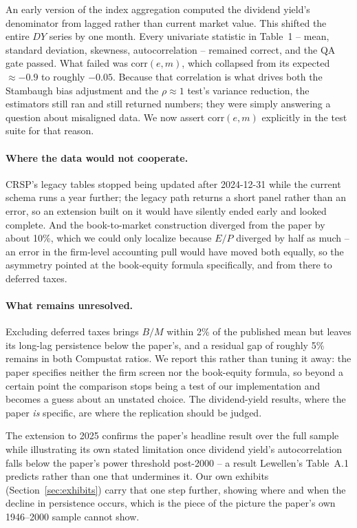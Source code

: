 \documentclass[11pt]{article}
\begin{document}
An early version of the index aggregation computed the dividend yield's
denominator from lagged rather than current market value. This shifted the
entire \(DY\) series by one month. Every univariate statistic in Table~1 --
mean, standard deviation, skewness, autocorrelation -- remained correct, and
the QA gate passed. What failed was \(\mathrm{corr}(e,m)\), which collapsed
from its expected \(\approx -0.9\) to roughly \(-0.05\). Because that
correlation is what drives both the Stambaugh bias adjustment and the
\(\rho \approx 1\) test's variance reduction, the estimators still ran and
still returned numbers; they were simply answering a question about
misaligned data. We now assert \(\mathrm{corr}(e,m)\) explicitly in the test
suite for that reason.

\paragraph{Where the data would not cooperate.}
CRSP's legacy tables stopped being updated after 2024-12-31 while the current
schema runs a year further; the legacy path returns a short panel rather than
an error, so an extension built on it would have silently ended early and
looked complete. And the book-to-market construction diverged from the paper
by about 10\%, which we could only localize because \(E/P\) diverged by half
as much -- an error in the firm-level accounting pull would have moved both
equally, so the asymmetry pointed at the book-equity formula specifically,
and from there to deferred taxes.

\paragraph{What remains unresolved.} Excluding deferred taxes brings \(B/M\)
within 2\% of the published mean but leaves its long-lag persistence below
the paper's, and a residual gap of roughly 5\% remains in both Compustat
ratios. We report this rather than tuning it away: the paper specifies
neither the firm screen nor the book-equity formula, so beyond a certain
point the comparison stops being a test of our implementation and becomes a
guess about an unstated choice. The dividend-yield results, where the paper
\emph{is} specific, are where the replication should be judged.

The extension to 2025 confirms the paper's headline result over the full
sample while illustrating its own stated limitation once dividend yield's
autocorrelation falls below the paper's power threshold post-2000 -- a
result Lewellen's Table~A.1 predicts rather than one that undermines it.
Our own exhibits (Section~\ref{sec:exhibits}) carry that one step further,
showing where and when the decline in persistence occurs, which is the
piece of the picture the paper's own 1946--2000 sample cannot show.
\end{document}
